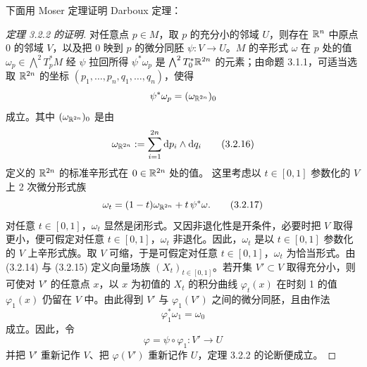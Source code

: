 
下面用 Moser 定理证明 Darboux 定理：

\begin{proof}[定理 3.2.2 的证明]
  对任意点 $p\in M$，取 $p$ 的充分小的邻域 $U$，则存在 $\mathbb{R}^n$ 中原点 $0$ 的邻域 $V$，以及把 $0$ 映到 $p$ 的微分同胚 $\psi\colon V\to U$。$M$ 的辛形式 $\omega$ 在 $p$ 处的值 $\omega_p\in\bigwedge^2T_p^*M$ 经 $\psi$ 拉回所得 $\psi^*\omega_p$ 是 $\bigwedge^2T_0^*\mathbb{R}^{2n}$ 的元素；由命题 3.1.1，可适当选取 $\mathbb{R}^{2n}$ 的坐标 $(p_1,\dots,p_n,q_1,\dots,q_n)$，使得
  \[
    \psi^*\omega_p=(\omega_{\mathbb{R}^{2n}})_0
  \]
  成立。其中 $(\omega_{\mathbb{R}^{2n}})_0$ 是由
  \begin{equation}
    \omega_{\mathbb{R}^{2n}}:=\sum_{i=1}^{2n}\mathrm{d} p_i\wedge \mathrm{d} q_i
    \tag{3.2.16}
  \end{equation}
  定义的 $\mathbb{R}^{2n}$ 的标准辛形式在 $0\in\mathbb{R}^{2n}$ 处的值。
  这里考虑以 $t\in[0,1]$ 参数化的 $V$ 上 2 次微分形式族
  \begin{equation}
    \omega_t=(1-t)\omega_{\mathbb{R}^{2n}}+t\,\psi^*\omega.
    \tag{3.2.17}
  \end{equation}
  对任意 $t\in[0,1]$，$\omega_t$ 显然是闭形式。又因非退化性是开条件，必要时把 $V$ 取得更小，便可假定对任意 $t\in[0,1]$，$\omega_t$ 非退化。因此，$\omega_t$ 是以 $t\in[0,1]$ 参数化的 $V$ 上辛形式族。取 $V$ 可缩，于是可假定对任意 $t\in[0,1]$，$\omega_t$ 为恰当形式。由 (3.2.14) 与 (3.2.15) 定义向量场族 $(X_t)_{t\in[0,1]}$。若开集 $V'\subset V$ 取得充分小，则可使对 $V'$ 的任意点 $x$，以 $x$ 为初值的 $X_t$ 的积分曲线 $\varphi_t(x)$ 在时刻 1 的值 $\varphi_1(x)$ 仍留在 $V$ 中。由此得到 $V'$ 与 $\varphi_1(V')$ 之间的微分同胚，且由作法
  \begin{equation}
    \varphi_1^*\omega_1=\omega_0
    \tag{3.2.18}
  \end{equation}
  成立。因此，令
  \begin{equation}
    \varphi=\psi\circ\varphi_1\colon V'\to U
    \tag{3.2.19}
  \end{equation}
  并把 $V'$ 重新记作 $V$、把 $\varphi(V')$ 重新记作 $U$，定理 3.2.2 的论断便成立。
\end{proof}

